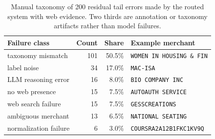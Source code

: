 \begin{table}[t]
\centering
\caption{Manual taxonomy of 200 residual tail errors made by the routed system with web evidence. Two thirds are annotation or taxonomy artifacts rather than model failures.}
\label{tab:failures}
\begin{tabular}{lrrl}
\toprule
Failure class & Count & Share & Example merchant\\
\midrule
taxonomy mismatch & 101 & 50.5\% & \texttt{WOMEN IN HOUSING \& FIN} \\
label noise & 34 & 17.0\% & \texttt{MAC-ISA} \\
LLM reasoning error & 16 & 8.0\% & \texttt{BIO COMPANY INC} \\
no web presence & 15 & 7.5\% & \texttt{AUTOAUTH SERVICE} \\
web search failure & 15 & 7.5\% & \texttt{GESSCREATIONS} \\
ambiguous merchant & 13 & 6.5\% & \texttt{NATIONAL SEATING} \\
normalization failure & 6 & 3.0\% & \texttt{COURSRA2A12B1FKC1KV9Q} \\
\bottomrule
\end{tabular}
\end{table}
